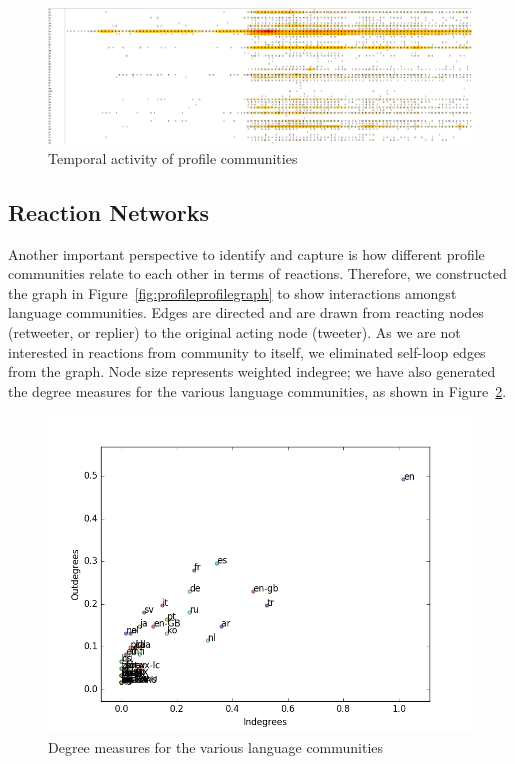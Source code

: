 \documentclass[conference]{IEEEtran}
\begin{document}
\begin{figure}[!h]
\centering
\includegraphics[width=\textwidth]{images/heatmap.png}
\caption{Temporal activity of profile communities}
\label{fig:heatmap}
\end{figure}


\subsection{Reaction Networks}\label{reactionnetworks}

Another important perspective to identify and capture is how different
profile communities relate to each other in terms of
reactions. Therefore, we constructed the graph in
Figure~\ref{fig:profileprofilegraph} to show interactions amongst
language communities. Edges are directed and are drawn from reacting
nodes (retweeter, or replier) to the original acting node
(tweeter). As we are not interested in reactions from community to
itself, we eliminated self-loop edges from the graph. Node size
represents weighted indegree; we have also generated the degree
measures for the various language communities, as shown in
Figure~\ref{fig:inoutdegree}.

\begin{figure}[!htb]
\centering
\includegraphics[width=\textwidth]{images/indegreeoutdegree.png}
\caption{Degree measures for the various language communities}
\label{fig:inoutdegree}
\end{figure}
\end{document}
